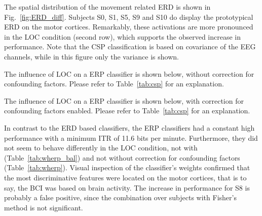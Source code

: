 \begin{sloppypar}
The spatial distribution of the movement related \ac{ERD} is shown in
Fig.~\ref{fig:ERD_diff}. Subjects S0, S1, S5,  S9 and S10 do display the
prototypical \ac{ERD} on the motor cortices. Remarkably, these activations are
more pronounced in the \ac{LOC} condition (second row), which supports the
observed increase in performance. 
%
Note that the \ac{CSP} classification is based on covariance of the \ac{EEG}
channels, while in this figure only the variance is shown. 
\end{sloppypar}


\begin{table}
  \caption{The influence of \protect\ac{LOC} on a \protect\ac{ERP} classifier
  is shown below, without correction for confounding factors. Please refer to
  Table~\ref{tab:csp} for an explanation.}
  \center \scriptsize
  
  \label{tab:wherp}
\end{table}

\begin{table}
  \caption{The influence of \protect\ac{LOC} on a \protect\ac{ERP} classifier
  is shown below, with correction for confounding factors enabled. Please refer
  to Table~\ref{tab:csp} for an explanation.}
  \center \scriptsize
  
  \label{tab:wherp_bal}
\end{table}

In contrast to the \ac{ERD} based classifiers, the \ac{ERP} classifiers had a
constant high performance with a minimum \ac{ITR} of 11.6 bits per minute.
Furthermore, they did not seem to behave differently in the \ac{LOC} 
condition, not with (Table~\ref{tab:wherp_bal}) and not without correction for
confounding factors (Table~\ref{tab:wherp}).
%
Visual inspection of the classifier's weights confirmed that the most
discriminative features were located on the motor cortices, that is to say, the
\ac{BCI} was based on brain activity.
%
The increase in performance for S8 is probably a false positive, since the
combination over subjects with Fisher's method is not significant.
